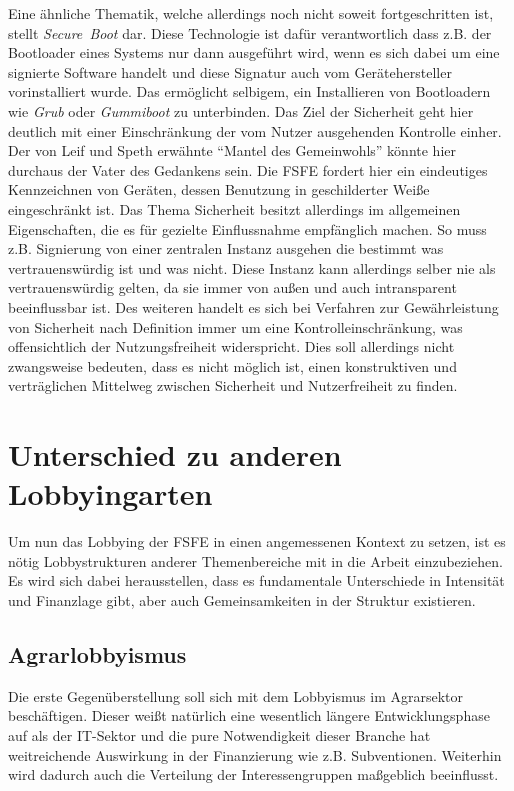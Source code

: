 Eine ähnliche Thematik, welche allerdings noch nicht soweit fortgeschritten 
ist, stellt \emph{Secure~Boot} dar. Diese Technologie ist dafür verantwortlich 
dass z.B. der Bootloader eines Systems nur dann ausgeführt wird, wenn es sich 
dabei um eine signierte Software handelt und diese Signatur auch vom 
Gerätehersteller vorinstalliert wurde. Das ermöglicht selbigem, ein 
Installieren von Bootloadern wie \emph{Grub} oder \emph{Gummiboot} zu 
unterbinden. Das Ziel der Sicherheit geht hier deutlich mit einer Einschränkung 
der vom Nutzer ausgehenden Kontrolle einher. Der von Leif und Speth erwähnte 
``Mantel des Gemeinwohls'' \cite{LeifSpeth200312} könnte hier durchaus der 
Vater des Gedankens sein. Die FSFE fordert hier ein eindeutiges Kennzeichnen 
von Geräten, dessen Benutzung in geschilderter Weiße eingeschränkt ist. 
\cite{FsfeSecureBoot} Das Thema Sicherheit besitzt allerdings im allgemeinen 
Eigenschaften, die es für gezielte Einflussnahme empfänglich machen. So muss 
z.B. Signierung von einer zentralen Instanz ausgehen die bestimmt was 
vertrauenswürdig ist und was nicht. Diese Instanz kann allerdings selber nie 
als vertrauenswürdig gelten, da sie immer von außen und auch intransparent 
beeinflussbar ist. Des weiteren handelt es sich bei Verfahren zur 
Gewährleistung von Sicherheit nach Definition immer um eine 
Kontrolleinschränkung, was offensichtlich der Nutzungsfreiheit widerspricht. 
Dies soll allerdings nicht zwangsweise bedeuten, dass es nicht möglich ist, 
einen konstruktiven und verträglichen Mittelweg zwischen Sicherheit und 
Nutzerfreiheit zu finden.

\section{Unterschied zu anderen Lobbyingarten}
Um nun das Lobbying der FSFE in einen angemessenen Kontext zu setzen, ist es 
nötig Lobbystrukturen anderer Themenbereiche mit in die Arbeit einzubeziehen. 
Es 
wird sich dabei herausstellen, dass es fundamentale Unterschiede in Intensität 
und Finanzlage gibt, aber auch Gemeinsamkeiten in der Struktur existieren.
\subsection{Agrarlobbyismus}
Die erste Gegenüberstellung soll sich mit dem Lobbyismus im Agrarsektor 
beschäftigen. Dieser weißt natürlich eine wesentlich längere Entwicklungsphase 
auf als der IT-Sektor und die pure Notwendigkeit dieser Branche hat 
weitreichende Auswirkung in der Finanzierung wie z.B. Subventionen. Weiterhin 
wird dadurch auch die Verteilung der Interessengruppen maßgeblich beeinflusst.

